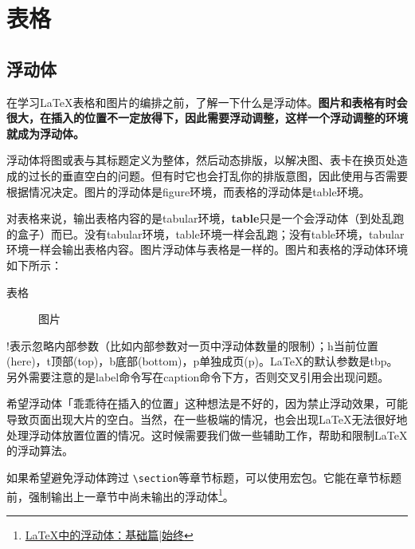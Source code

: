 \newpage
\chapter{表格}
\thispagestyle{chapterpage}

\section{浮动体}

在学习\LaTeX{}表格和图片的编排之前，了解一下什么是浮动体。\textbf{图片和表格有时会很大，在插入的位置不一定放得下，因此需要浮动调整，这样一个浮动调整的环境就成为浮动体。}


浮动体将图或表与其标题定义为整体，然后动态排版，以解决图、表卡在换页处造成的过长的垂直空白的问题。但有时它也会打乱你的排版意图，因此使用与否需要根据情况决定。图片的浮动体是figure环境，而表格的浮动体是table环境。

对表格来说，输出表格内容的是tabular环境，\textbf{table}只是一个会浮动体（到处乱跑的盒子）而已。没有tabular环境，table环境一样会乱跑；没有table环境，tabular环境一样会输出表格内容。图片浮动体与表格是一样的。图片和表格的浮动体环境如下所示：

\begin{latex}
\begin{table}[!htbp]
表格
\end{table}
\begin{figure}[!htbp]
图片
\end{figure}
\end{latex}

!表示忽略内部参数（比如内部参数对一页中浮动体数量的限制）；h当前位置(here)，t顶部(top)，b底部(bottom)，p单独成页(p)。\LaTeX{}的默认参数是tbp。另外需要注意的是label命令写在caption命令下方，否则交叉引用会出现问题。

希望浮动体「乖乖待在插入的位置」这种想法是不好的，因为禁止浮动效果，可能导致页面出现大片的空白。当然，在一些极端的情况，也会出现\LaTeX{}无法很好地处理浮动体放置位置的情况。这时候需要我们做一些辅助工作，帮助和限制\LaTeX{}的浮动算法。

如果希望避免浮动体跨过 \lstinline|\section|等章节标题，可以使用宏包。它能在章节标题前，强制输出上一章节中尚未输出的浮动体\footnote{\href{http://liam0205.me/2017/03/11/floats-in-LaTeX-basic/}{\LaTeX{}中的浮动体：基础篇|始终}}。

